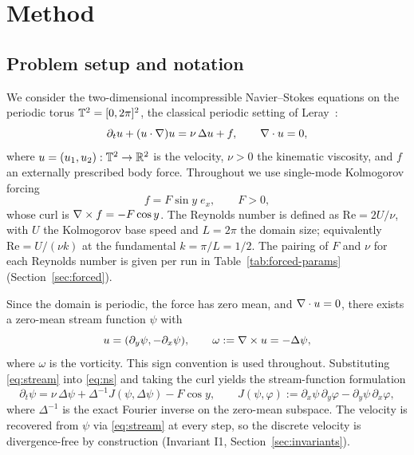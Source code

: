 
\section{Method}
\label{sec:methods}

\subsection{Problem setup and notation}
\label{sec:problem}

We consider the two-dimensional incompressible Navier--Stokes equations on the
periodic torus $\mathbb{T}^2 = [0,2\pi]^2$, the classical periodic setting of
Leray~\cite{leray1934}:
\begin{equation}
  \partial_t u + (u\cdot\nabla)u = \nu\,\Delta u + f,
  \qquad \nabla\cdot u = 0,
  \label{eq:ns}
\end{equation}
where $u = (u_1,u_2): \mathbb{T}^2 \to \mathbb{R}^2$ is the velocity, $\nu > 0$ the kinematic
viscosity, and $f$ an externally prescribed body force. Throughout we use
single-mode Kolmogorov forcing
\begin{equation}
  f = F \sin y \; e_x, \qquad F > 0,
  \label{eq:forcing}
\end{equation}
whose curl is $\nabla \times f = -F\cos y$. The Reynolds number is defined as
$\mathrm{Re} = 2U/\nu$, with $U$ the Kolmogorov base speed and $L = 2\pi$ the
domain size; equivalently $\mathrm{Re} = U/(\nu k)$ at the fundamental
$k = \pi/L = 1/2$. The pairing of $F$ and $\nu$ for each Reynolds number is
given per run in Table~\ref{tab:forced-params} (Section~\ref{sec:forced}).

Since the domain is periodic, the force has zero mean, and $\nabla \cdot u = 0$,
there exists a zero-mean stream function $\psi$ with
\begin{equation}
  u = (\partial_y \psi, -\partial_x \psi),
  \qquad \omega := \nabla \times u = -\Delta \psi,
  \label{eq:stream}
\end{equation}
where $\omega$ is the vorticity. This sign convention is used throughout.
Substituting \eqref{eq:stream} into \eqref{eq:ns} and taking the curl yields
the stream-function formulation
\begin{equation}
  \partial_t \psi
  = \nu\,\Delta \psi + \Delta^{-1} J(\psi, \Delta \psi) - F \cos y,
  \qquad
  J(\psi, \varphi) := \partial_x \psi\, \partial_y \varphi
                      - \partial_y \psi\, \partial_x \varphi,
  \label{eq:stream-ns}
\end{equation}
where $\Delta^{-1}$ is the exact Fourier inverse on the zero-mean subspace.
The velocity is recovered from $\psi$ via \eqref{eq:stream} at every step, so
the discrete velocity is divergence-free by construction (Invariant I1,
Section~\ref{sec:invariants}).

